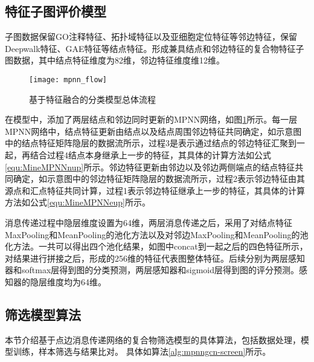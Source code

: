 \subsection{特征子图评价模型}
子图数据保留GO注释特征、拓扑域特征以及亚细胞定位特征等邻边特征，保留Deepwalk特征、GAE特征等结点特征。形成兼具结点和邻边特征的复合物特征子图数据，其中结点特征维度为82维，邻边特征维度维12维。

\begin{figure}[htbp]
    \centering
    \texttt{[image: mpnn\_flow]}
    \caption{基于特征融合的分类模型总体流程}
    \label{fig:mpnn_flow}
\end{figure}

在模型中，添加了两层结点和邻边同时更新的MPNN网络，如图\ref{fig:mpnn_flow}所示。每一层MPNN网络中，结点特征更新由结点以及结点周围邻边特征共同确定，如示意图中的结点特征矩阵隐层的数据流所示，过程3是表示通过结点的邻边特征汇聚到一起，再结合过程4结点本身继承上一步的特征，其具体的计算方法如公式\ref{equ:MineMPNNnup}所示。邻边特征更新由邻边以及邻边两侧端点的结点特征共同确定，如示意图中的邻边特征矩阵隐层的数据流所示，过程2表示邻边特征由其源点和汇点特征共同计算，过程1表示邻边特征继承上一步的特征，其具体的计算方法如公式\ref{equ:MineMPNNeup}所示。

消息传递过程中隐层维度设置为64维，两层消息传递之后，采用了对结点特征MaxPooling和MeanPooling的池化方法以及对邻边MaxPooling和MeanPooling的池化方法。一共可以得出四个池化结果，如图中concat到一起之后的四色特征所示，对结果进行拼接之后，形成的256维的特征代表图整体特征。后续分别为两层感知器和softmax层得到图的分类预测，两层感知器和sigmoid层得到图的评分预测。感知器的隐层维度均为64维。

\subsection{筛选模型算法}
本节介绍基于点边消息传递网络的复合物筛选模型的具体算法，包括数据处理，模型训练，样本筛选与结果比对。
具体如算法\ref{alg:mpnngcn-screen}所示。

